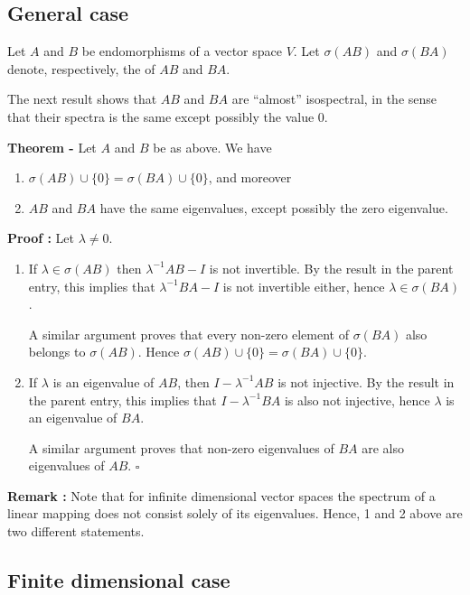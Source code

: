 \documentclass[12pt]{article}
\begin{document}

\subsection{General case}

Let $A$ and $B$ be endomorphisms of a vector space $V$. Let $\sigma(AB)$ and $\sigma(BA)$ denote, respectively, the  of $AB$ and $BA$.

The next result shows that $AB$ and $BA$ are ``almost'' isospectral, in the sense that their spectra is the same except possibly the value $0$.

{\bf Theorem -} Let $A$ and $B$ be as above. We have
\begin{enumerate}
\item $\sigma(AB) \cup \{0\} = \sigma(BA) \cup \{0\}$, and moreover
\item $AB$ and $BA$ have the same eigenvalues, except possibly the zero eigenvalue.
\end{enumerate}

{\bf Proof :} Let  $\lambda \ne 0$.
\begin{enumerate}
\item  If $\lambda \in \sigma(AB)$ then $\lambda^{-1} AB - I$ is not invertible.  By the result in the parent entry, this implies that $\lambda^{-1} BA - I$ is not invertible either, hence $\lambda \in \sigma(BA)$.

A similar argument proves that every non-zero element of $\sigma(BA)$ also belongs to $\sigma(AB)$. Hence $\sigma(AB) \cup \{0\} = \sigma(BA) \cup \{0\}$.

\item If $\lambda$ is an eigenvalue of $AB$, then $I-\lambda^{-1}AB$ is not injective. By the result in the parent entry, this implies that $I-\lambda^{-1}BA$ is also not injective, hence $\lambda$ is an eigenvalue of $BA$.

A similar argument proves that non-zero eigenvalues of $BA$ are also eigenvalues of $AB$. $\square$
\end{enumerate}

{\bf Remark :} Note that for infinite dimensional vector spaces the spectrum of a linear mapping does not consist solely  of its eigenvalues. Hence, 1 and 2 above are two different statements.

\subsection{Finite dimensional case}
\end{document}
